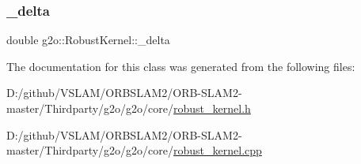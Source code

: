 \subsubsection{\texorpdfstring{\+\_\+delta}{\_delta}}
{\footnotesize\ttfamily double g2o\+::\+Robust\+Kernel\+::\+\_\+delta\hspace{0.3cm}{\ttfamily [protected]}}



The documentation for this class was generated from the following files\+:\begin{DoxyCompactItemize}
\item 
D\+:/github/\+V\+S\+L\+A\+M/\+O\+R\+B\+S\+L\+A\+M2/\+O\+R\+B-\/\+S\+L\+A\+M2-\/master/\+Thirdparty/g2o/g2o/core/\mbox{\hyperlink{robust__kernel_8h}{robust\+\_\+kernel.\+h}}\item 
D\+:/github/\+V\+S\+L\+A\+M/\+O\+R\+B\+S\+L\+A\+M2/\+O\+R\+B-\/\+S\+L\+A\+M2-\/master/\+Thirdparty/g2o/g2o/core/\mbox{\hyperlink{robust__kernel_8cpp}{robust\+\_\+kernel.\+cpp}}\end{DoxyCompactItemize}
